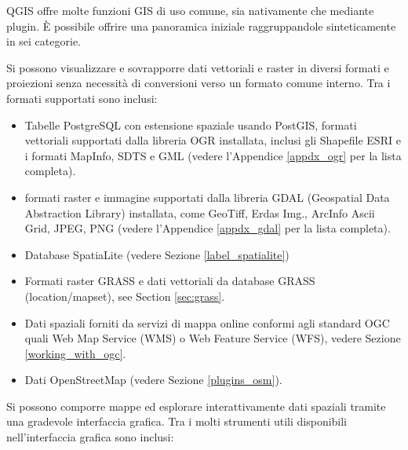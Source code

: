 \label{label_majfeat}

\qg QGIS offre molte funzioni GIS di uso comune, sia nativamente che mediante 
plugin. È possibile offrire una panoramica iniziale raggruppandole sinteticamente 
in sei categorie.


Si possono visualizzare e sovrapporre dati vettoriali e raster in diversi formati e proiezioni senza
necessità di conversioni verso un formato comune interno. Tra i formati supportati sono inclusi:

\begin{itemize}[label=--]
\item  Tabelle PostgreSQL con estensione spaziale usando PostGIS, formati vettoriali 
supportati dalla libreria OGR installata, inclusi gli Shapefile ESRI e i formati MapInfo, 
SDTS e GML (vedere l’Appendice \ref{appdx_ogr} per la lista completa).
\item  formati raster e immagine supportati dalla libreria GDAL (Geospatial Data 
Abstraction Library) installata, come GeoTiff, Erdas Img., ArcInfo Ascii Grid, 
JPEG, PNG (vedere l’Appendice \ref{appdx_gdal} per la lista completa).
\item Database SpatiaLite (vedere Sezione \ref{label_spatialite}) 
\item Formati raster GRASS e dati vettoriali da database GRASS (location/mapset),
see Section \ref{sec:grass}.
\item Dati spaziali forniti da servizi di mappa online conformi agli standard OGC quali Web Map
Service (WMS) o Web Feature Service (WFS), vedere Sezione \ref{working_with_ogc}.
\item Dati OpenStreetMap (vedere Sezione \ref{plugins_osm}).
\end{itemize}


Si possono comporre mappe ed esplorare interattivamente dati spaziali tramite una gradevole 
interfaccia grafica. Tra i molti strumenti utili disponibili nell’interfaccia grafica sono inclusi:

